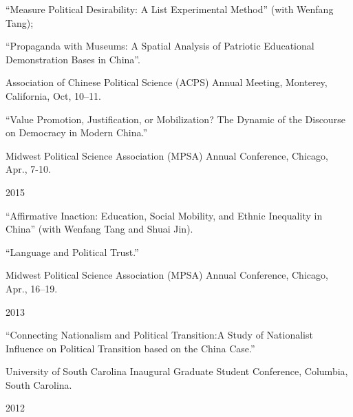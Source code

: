 \documentclass[10.5pt,]{article}
\providecommand{\tightlist}{%
  \setlength{\itemsep}{0pt}\setlength{\parskip}{0pt}}
\renewenvironment{itemize}{
  \begin{list}{}{
    \setlength{\leftmargin}{1.5em}
  }
}{
  \end{list}
}
\begin{document}
\begin{itemize}
  \begin{itemize}
  \tightlist
  \item
    ``Measure Political Desirability: A List Experimental Method'' (with
    Wenfang Tang);
  \item
    ``Propaganda with Museums: A Spatial Analysis of Patriotic
    Educational Demonstration Bases in China''.

    \begin{itemize}
    \tightlist
    \item
      \footnotesize Association of Chinese Political Science (ACPS)
      Annual Meeting, Monterey, California, Oct, 10--11.
    \end{itemize}
  \item
    ``Value Promotion, Justification, or Mobilization? The Dynamic of
    the Discourse on Democracy in Modern China.''

    \begin{itemize}
    \tightlist
    \item
      \footnotesize Midwest Political Science Association (MPSA) Annual
      Conference, Chicago, Apr., 7-10.
    \end{itemize}
  \end{itemize}
\item
  2015

  \begin{itemize}
  \tightlist
  \item
    ``Affirmative Inaction: Education, Social Mobility, and Ethnic
    Inequality in China'' (with Wenfang Tang and Shuai Jin).
  \item
    ``Language and Political Trust.''

    \begin{itemize}
    \tightlist
    \item
      \footnotesize Midwest Political Science Association (MPSA) Annual
      Conference, Chicago, Apr., 16--19.
    \end{itemize}
  \end{itemize}
\item
  2013

  \begin{itemize}
  \tightlist
  \item
    ``Connecting Nationalism and Political Transition:A Study of
    Nationalist Influence on Political Transition based on the China
    Case.''

    \begin{itemize}
    \tightlist
    \item
      \footnotesize University of South Carolina Inaugural Graduate
      Student Conference, Columbia, South Carolina.
    \end{itemize}
  \end{itemize}
\item
  2012


\end{itemize}
\end{document}
